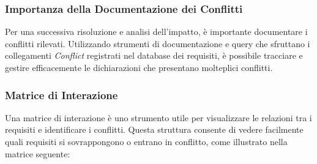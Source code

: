 \subsubsection{Importanza della Documentazione dei Conflitti}
\begin{figure}[H]
    \centering
\end{figure}
Per una successiva risoluzione e analisi dell'impatto, è importante documentare i
conflitti rilevati. Utilizzando strumenti di documentazione e query che sfruttano
i collegamenti \textit{Conflict} registrati nel database dei requisiti, è possibile
tracciare e gestire efficacemente le dichiarazioni che presentano molteplici conflitti.

\subsubsection{Matrice di Interazione}
Una matrice di interazione è uno strumento utile per visualizzare le relazioni
tra i requisiti e identificare i conflitti. Questa struttura consente di vedere
facilmente quali requisiti si sovrappongono o entrano in conflitto, come illustrato
nella matrice seguente:


